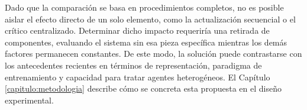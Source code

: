 Dado que la comparación se basa en procedimientos completos, no es posible aislar el efecto directo de un solo elemento, como la actualización secuencial o el crítico centralizado. Determinar dicho impacto requeriría una retirada de componentes, evaluando el sistema sin esa pieza específica mientras los demás factores permanecen constantes. De este modo, la solución puede contrastarse con los antecedentes recientes en términos de representación, paradigma de entrenamiento y capacidad para tratar agentes heterogéneos. El Capítulo \ref{capitulo:metodologia} describe cómo se concreta esta propuesta en el diseño experimental.
